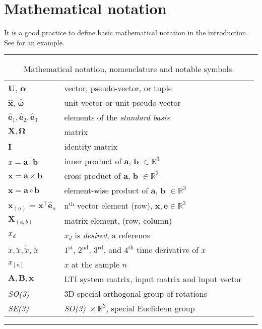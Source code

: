 \section{Mathematical notation}

It is a good practice to define basic mathematical notation in the introduction.
See  for an example.

\begin{table*}[!h]
  \scriptsize
  \centering
  \noindent\rule{\textwidth}{0.5pt}
  \begin{tabular}{lll}
    $\mathbf{U}$, $\bm{\alpha}$ & vector, pseudo-vector, or tuple\\
    $\mathbf{\hat{x}}$, $\bm{\hat{\omega}}$& unit vector or unit pseudo-vector\\
    $\mathbf{\hat{e}}_1, \mathbf{\hat{e}}_2, \mathbf{\hat{e}}_3$ & elements of the \emph{standard basis} \\
    $\mathbf{X}, \bm{\Omega}$ & matrix \\
    $\mathbf{I}$ & identity matrix \\
    $x = \mathbf{a}^\intercal\mathbf{b}$ & inner product of $\mathbf{a}$, $\mathbf{b}$ $\in \mathbb{R}^3$\\
    $\mathbf{x} = \mathbf{a}\times\mathbf{b}$ & cross product of $\mathbf{a}$, $\mathbf{b}$ $\in \mathbb{R}^3$\\
    $\mathbf{x} = \mathbf{a}\circ\mathbf{b}$ & element-wise product of $\mathbf{a}$, $\mathbf{b}$ $\in \mathbb{R}^3$ \\
    $\mathbf{x}_{(n)}$ = $\mathbf{x}^\intercal\mathbf{\hat{e}}_n$ & $\mathrm{n}^{\mathrm{th}}$ vector element (row), $\mathbf{x}, \mathbf{e} \in \mathbb{R}^3$\\
    $\mathbf{X}_{(a,b)}$ & matrix element, (row, column)\\
    $x_{d}$ & $x_d$ is \emph{desired}, a reference\\
    $\dot{x}, \ddot{x}, \dot{\ddot{x}}$, $\ddot{\ddot{x}}$ & ${1^{\mathrm{st}}}$, ${2^{\mathrm{nd}}}$, ${3^{\mathrm{rd}}}$, and ${4^{\mathrm{th}}}$ time derivative of $x$\\
    $x_{[n]}$ & $x$ at the sample $n$ \\
    $\mathbf{A}, \mathbf{B}, \mathbf{x}$ & LTI system matrix, input matrix and input vector\\
    \emph{SO(3)} & 3D special orthogonal group of rotations\\
    \emph{SE(3)} & \emph{SO(3)}~$\times~\mathbb{R}^3$, special Euclidean group\\
  \end{tabular}
  \noindent\rule{\textwidth}{0.5pt}
  \caption{Mathematical notation, nomenclature and notable symbols.}
  \label{tab:mathematical_notation}
\end{table*}
